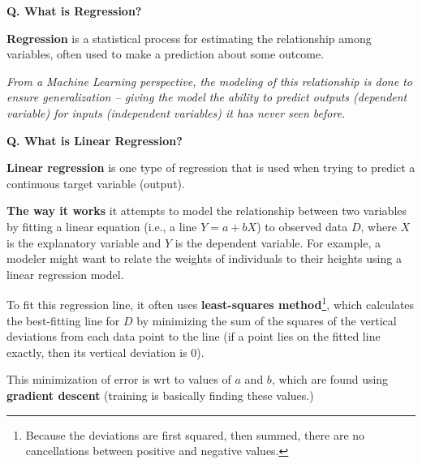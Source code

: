 \begin{frame}[fragile]{\textbf{Q. What is Regression?}}
  \begin{wideitemize}
  \item \textbf{Regression} is a statistical process for estimating
  the relationship among variables, often used to make a prediction about
  some outcome.\medskip
  \begin{wideitemize} 
    \item \textit{From a Machine Learning perspective, the modeling of this relationship
    is done to ensure generalization -- giving the model the ability to predict
    outputs (dependent variable) for inputs (independent variables) it has never
    seen before.}
  \end{wideitemize}
  \end{wideitemize}
\end{frame}

\begin{frame}[fragile]{\textbf{Q. What is Linear Regression?}}
  \begin{wideitemize}
  \item \textbf{Linear regression} is one type of regression that is used when
    trying to predict a continuous target variable (output).
    \begin{wideitemize} 
    \item \textbf{The way it works} it attempts to model the relationship between two variables by fitting
      a linear equation (i.e., a line $Y = a + bX$) to observed data $D$, where $X$
      is the explanatory variable and $Y$ is the dependent variable.
      {\footnotesize For example, a modeler might want to relate the weights of individuals to
        their heights using a linear regression model.}
    \item To fit this regression line, it often uses \textbf{least-squares
        method}\footnote{Because the deviations are first squared, then summed,
        there are no cancellations between positive and negative values.},
      {\footnotesize which calculates the best-fitting line for
        $D$ by minimizing the sum of the squares of the vertical
        deviations from each data point to the line (if a point lies on the
        fitted line exactly, then its vertical deviation is $0$).}      
    \item This minimization of error is wrt to values of $a$ and $b$, which are
      found using \textbf{gradient descent} (training is basically finding
      these values.)
    \end{wideitemize}
  \end{wideitemize}
\end{frame}



